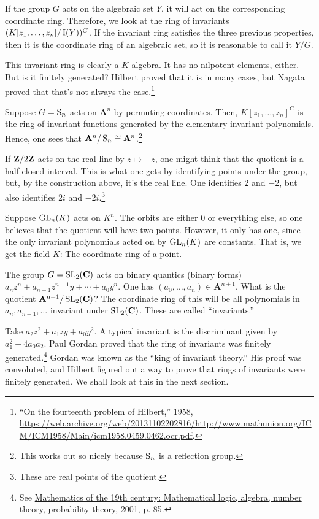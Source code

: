 \documentclass [11 pt, oneside] {article}
\begin{document}
If the group $G$ acts on the algebraic set $Y$, it will act on the corresponding coordinate ring. Therefore, we look at the ring of invariants $(K[z_1,\hdots,z_n]/\operatorname{I}(Y))^G$. If the invariant ring satisfies the three previous properties, then it is the coordinate ring of an algebraic set, so it is reasonable to call it $Y/G$.

This invariant ring is clearly a $K$-algebra. It has no nilpotent elements, either. But is it finitely generated? Hilbert proved that it is in many cases, but Nagata proved that that's not always the case.\footnote{``On the fourteenth problem of Hilbert,'' 1958, \url{https://web.archive.org/web/20131102202816/http://www.mathunion.org/ICM/ICM1958/Main/icm1958.0459.0462.ocr.pdf}.}

\begin{example}[ ]\label{}
Suppose $G=\operatorname{S}_n$ acts on $\mathbf{A}^n$ by permuting coordinates. Then, $K[z_1,\hdots, z_n]^G$ is the ring of invariant functions generated by the elementary invariant polynomials. Hence, one sees that $\mathbf{A}^n/\operatorname{S}_n\cong \mathbf{A}^n$.\footnote{This works out so nicely because $\operatorname{S}_n$ is a reflection group.}
\end{example}


If $\mathbf Z / 2\mathbf Z$ acts on the real line by $z\longmapsto -z$, one might think that the quotient is a half-closed interval. This is what one gets by identifying points under the group, but, by the construction above, it's the real line. One identifies $2$ and $-2$, but also identifies $2i$ and $-2i$.\footnote{These are real points of the quotient.}


 \begin{example}[ ]\label{}
Suppose $\operatorname{GL}_{n}(K)$ acts on $K^n$. The orbits are either $0$ or everything else, so one believes that the quotient will have two points. However, it only has one, since the only invariant polynomials acted on by $\operatorname{GL}_{n}(K)$ are constants. That is, we get the field $K$: The coordinate ring of a point.
\end{example}

\begin{example}\label{}
The group $G=\operatorname{SL}_{2}(\mathbf{C})$ acts on binary quantics (binary forms) $a_nz^n + a_{n-1}z^{n-1}y + \cdots +a_0y^n$. One has $(a_0,\hdots, a_n)\in \mathbf{A}^{n+1}$. What is the quotient $\mathbf{A}^{n+1}/\operatorname{SL}_{2}(\mathbf{C})$? The coordinate ring of this will be all polynomials in $a_n,a_{n-1},\hdots$ invariant under $\operatorname{SL}_{2}(\mathbf{C})$. These are called ``invariants.''

Take $a_2z^2 + a_1zy + a_0y^2$. A typical invariant is the discriminant given by $a_1^2 - 4a_0a_2$. Paul Gordan proved that the ring of invariants was finitely generated.\footnote{See \ul{Mathematics of the 19th century: Mathematical logic, algebra, number theory, probability theory}, 2001, p. 85.} Gordan was known as the ``king of invariant theory.'' His proof was convoluted, and Hilbert figured out a way to prove that rings of invariants were finitely generated. We shall look at this in the next section.
\end{example}
\end{document}
